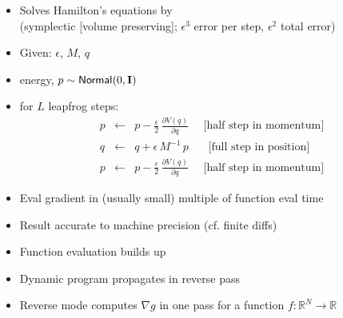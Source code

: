 \documentclass[10pt]{report}
\begin{document}
\begin{itemize}
\item Solves Hamilton's equations by 
  \\
  {\footnotesize (symplectic [volume preserving]; $\epsilon^3$ error per step, $\epsilon^2$ total error)}
\item Given:  $\epsilon$,  $M$,  $q$
\item {} energy, $p \sim {\sf
    Normal}(0,\mbox{\bf I})$
\item {} for $L$ leapfrog steps:
  \begin{eqnarray*}
    p & \leftarrow &
    p - \frac{\epsilon}{2} \, \frac{\partial V(q)}{\partial q}
    \ \ \ \ \ \ \mbox{[half step in momentum]}
    \\[6pt]
    q & \leftarrow &
    q + \epsilon \, M^{-1} \, p
    \ \ \ \ \ \ \ \  \mbox{[full step in position]}
    \\[6pt]
    p & \leftarrow &
    p - \frac{\epsilon}{2} \, \frac{\partial V(q)}{\partial q}
    \ \ \ \ \ \ \mbox{[half step in momentum]}
  \end{eqnarray*}
\end{itemize}


\begin{itemize}
\item Eval gradient in (usually small) multiple of function eval time
%
\item Result accurate to machine precision (cf. finite diffs)
\item Function evaluation builds up 
\item Dynamic program propagates  in reverse pass
\item Reverse mode computes $\nabla g$ in one
  pass for a function $f : \mathbb{R}^N \rightarrow \mathbb{R}$
\end{itemize}
\end{document}

